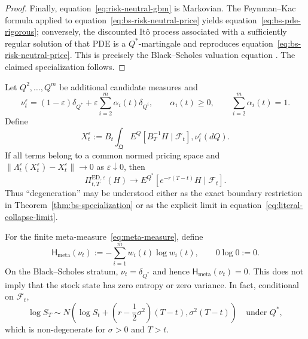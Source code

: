\begin{proof}
Finally, equation~\eqref{eq:risk-neutral-gbm} is Markovian.  The Feynman--Kac
formula applied to equation~\eqref{eq:bs-risk-neutral-price} yields
equation~\eqref{eq:bs-pde-rigorous}; conversely, the discounted It\^o process
associated with a sufficiently regular solution of that PDE is a
$Q^*$-martingale and reproduces equation~\eqref{eq:bs-risk-neutral-price}.
This is precisely the Black--Scholes valuation equation
\cite{blackscholes1973}.  The claimed specialization follows.
\end{proof}

\begin{corollary}
\label{cor:bs-collapse-limit}
Let $Q^2,\ldots,Q^m$ be additional candidate measures and
\[
  \nu_t^\varepsilon
  =(1-\varepsilon)\delta_{Q^*}
   +\varepsilon\sum_{i=2}^m\alpha_i(t)\delta_{Q^i},
  \qquad \alpha_i(t)\geq0,
  \qquad \sum_{i=2}^m\alpha_i(t)=1.
\]
Define
\[
  X_t^\varepsilon:=B_t\int_{\mathfrak Q}
  E^Q[B_T^{-1}H\mid\mathcal F_t],\nu_t^\varepsilon(dQ).
\]
If all terms belong to a common normed pricing space and
$\|\Lambda_t^\varepsilon(X_t^\varepsilon)-X_t^\varepsilon\|\to0$ as
$\varepsilon\downarrow0$, then
\begin{equation}
  \Pi^{\mathrm{ED},\varepsilon}_{t,T}(H)
  \longrightarrow
  E^{Q^*}[e^{-r(T-t)}H\mid\mathcal F_t].
  \label{eq:literal-collapse-limit}
\end{equation}
Thus ``degeneration'' may be understood either as the exact boundary
restriction in Theorem~\ref{thm:bs-specialization} or as the explicit limit in
equation~\eqref{eq:literal-collapse-limit}.
\end{corollary}

\begin{remark}
\label{rem:meta-vs-state-entropy}
For the finite meta-measure~\eqref{eq:meta-measure}, define
\[
  \mathsf H_{\mathrm{meta}}(\nu_t)
  :=-\sum_{i=1}^m w_i(t)\log w_i(t),
  \qquad 0\log0:=0.
\]
On the Black--Scholes stratum,
$\nu_t=\delta_{Q^*}$ and hence
$\mathsf H_{\mathrm{meta}}(\nu_t)=0$.  This does not imply that the stock state
has zero entropy or zero variance.  In fact, conditional on $\mathcal F_t$,
\begin{equation}
  \log S_T
  \sim N\!\left(
      \log S_t+\left(r-\frac12\sigma^2\right)(T-t),
      \sigma^2(T-t)
    \right)
  \quad\text{under }Q^*,
  \label{eq:lognormal-nondegenerate}
\end{equation}
which is non-degenerate for $\sigma>0$ and $T>t$.
\end{remark}

